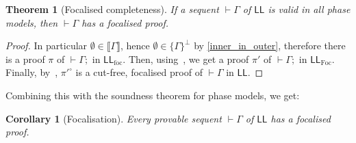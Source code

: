 \documentclass[11pt]{article}
\newtheorem{theorem}{Theorem}
\newtheorem{corollary}{Corollary}[theorem]
\newcommand\LL{\textsf{LL}}
\newcommand\LLfoc{{\LL_\text{foc}}}
\newcommand\LLFoc{{\LL_\text{Foc}}}
\newcommand\sem[1]{{\llbracket #1 \rrbracket}}
\begin{document}
\begin{theorem}[Focalised completeness]
    If a sequent $\vdash \Gamma$ of $\LL$ is valid in all phase models, then $\vdash \Gamma$ has a focalised proof.
\end{theorem}
\begin{proof}
    In particular $\emptyset \in \sem{\Gamma}$, hence $\emptyset \in \{\Gamma\}^\perp$ by
    \cref{inner_in_outer}, therefore there is a proof $\pi$ of $\vdash \Gamma;$ in $\LLfoc$.
    Then, using~\cite[section 3.2]{laurent}, we get a proof $\pi'$ of $\vdash \Gamma;$ in $\LLFoc$.
    Finally, by~\cite[proposition 2]{laurent}, $\pi'^\circ$ is a cut-free, focalised proof of $\vdash \Gamma$ in $\LL$.
\end{proof}

Combining this with the soundness theorem for phase models, we get:
\begin{corollary}[Focalisation]
    Every provable sequent $\vdash \Gamma$ of $\LL$ has a focalised proof.
\end{corollary}

\printbibliography
\end{document}
